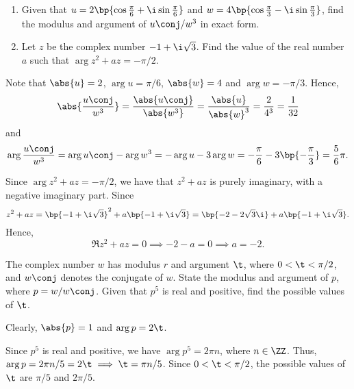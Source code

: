\begin{problem}
    \begin{enumerate}
        \item Given that $u = 2\bp{\cos\frac\pi6 + \i\sin\frac\pi6}$ and $w = 4\bp{\cos\frac\pi3 - \i\sin\frac\pi3}$, find the modulus and argument of $u\conj/w^3$ in exact form.
        \item Let $z$ be the complex number $-1 + \i\sqrt3$. Find the value of the real number $a$ such that $\arg{z^2 + az} = -\pi/2$.
    \end{enumerate}
\end{problem}
\begin{solution}
    \begin{ppart}
        Note that $\abs{u} = 2$, $\arg u = \pi/6$, $\abs{w} = 4$ and $\arg w = -\pi/3$. Hence, \[\abs{\frac{u\conj}{w^3}} = \frac{\abs{u\conj}}{\abs{w^3}} = \frac{\abs{u}}{\abs{w}^3} = \frac{2}{4^3} = \frac1{32}\] and \[\arg \frac{u\conj}{w^3} = \arg u\conj - \arg w^3 = -\arg u - 3\arg w = -\frac\pi6 - 3 \bp{-\frac\pi3} = \frac56 \pi.\]
    \end{ppart}
    \begin{ppart}
        Since $\arg{z^2 + az} = -\pi/2$, we have that $z^2 + az$ is purely imaginary, with a negative imaginary part. Since \[z^2 + az = \bp{-1 + \i\sqrt3}^2 + a\bp{-1 + \i \sqrt3} = \bp{-2 -2\sqrt3 \i} + a\bp{-1 + \i\sqrt3}.\] Hence, \[\Re{z^2 + az} = 0 \implies -2 -a = 0 \implies a = -2.\]
    \end{ppart}
\end{solution}

\begin{problem}
    The complex number $w$ has modulus $r$ and argument $\t$, where $0 < \t < \pi/2$, and $w\conj$ denotes the conjugate of $w$. State the modulus and argument of $p$, where $p = w/w\conj$. Given that $p^5$ is real and positive, find the possible values of $\t$.
\end{problem}
\begin{solution}
    Clearly, $\abs{p} = 1$ and $\arg p = 2\t$.

    Since $p^5$ is real and positive, we have $\arg p^5 = 2\pi n$, where $n \in \ZZ$. Thus, $\arg p = 2\pi n/5 = 2\t \implies \t =\pi n/5$. Since $0 < \t < \pi/2$, the possible values of $\t$ are $\pi/5$ and $2\pi/5$.
\end{solution}

